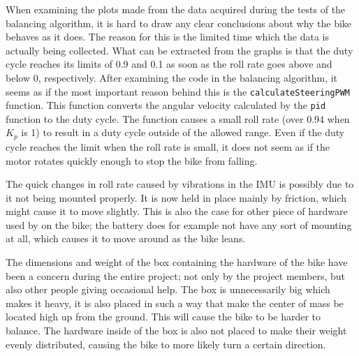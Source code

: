 When examining the plots made from the data acquired during the tests of the balancing algorithm, it is hard to draw any clear conclusions about why the bike behaves as it does. The reason for this is the limited time which the data is actually being collected. What can be extracted from the graphs is that the duty cycle reaches its limits of 0.9 and 0.1 as soon as the roll rate goes above and below 0, respectively. After examining the code in the balancing algorithm, it seems as if the most important reason behind this is the \texttt{calculateSteeringPWM} function. This function converts the angular velocity calculated by the \texttt{pid} function to the duty cycle. The function causes a small roll rate (over 0.94 when $K_p$ is 1) to result in a duty cycle outside of the allowed range. Even if the duty cycle reaches the limit when the roll rate is small, it does not seem as if the motor rotates quickly enough to stop the bike from falling.

The quick changes in roll rate caused by vibrations in the IMU is possibly due to it not being mounted properly. It is now held in place mainly by friction, which might cause it to move slightly. This is also the case for other piece of hardware used by on the bike; the battery does for example not have any sort of mounting at all, which causes it to move around as the bike leans.

The dimensions and weight of the box containing the hardware of the bike have been a concern during the entire project; not only by the project members, but also other people giving occasional help. The box is unnecessarily big which makes it heavy, it is also placed in such a way that make the center of mass be located high up from the ground. This will cause the bike to be harder to balance. The hardware inside of the box is also not placed to make their weight evenly distributed, causing the bike to more likely turn a certain direction.